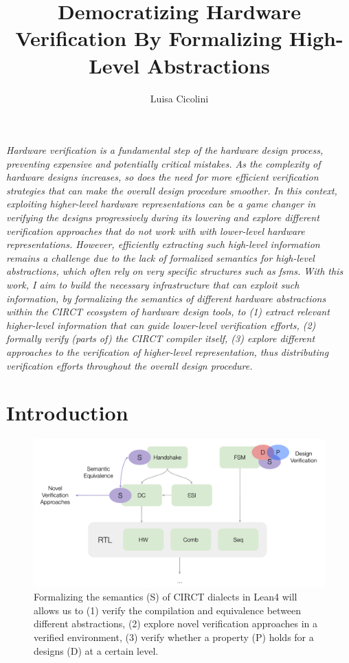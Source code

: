\documentclass[sigconf,authorversion,nonacm, 11pt]{acmart}
\begin{document}
\title{Democratizing Hardware Verification By Formalizing High-Level Abstractions}

\author{Luisa Cicolini}

\maketitle
\thispagestyle{empty}

\textit{
    Hardware verification is a fundamental step of the hardware design process, preventing expensive and potentially critical 
    mistakes.
    As the complexity of hardware designs increases, so does the need for more efficient verification strategies that can 
    make the overall design procedure smoother.
    In this context, exploiting higher-level hardware representations can be a game changer in verifying the designs 
    progressively during its lowering and explore different verification approaches that do not work with 
    with lower-level hardware representations. 
    However, efficiently extracting such high-level information remains a challenge due to the lack of formalized semantics  
    for high-level abstractions, which often rely on very specific structures such as \acp{fsm}.
    With this work, I aim to build the necessary infrastructure that can exploit such information,
    by formalizing the semantics of different hardware abstractions within the CIRCT ecosystem of hardware design tools, to 
    (1) extract relevant higher-level information that can guide lower-level verification efforts, 
    (2) formally verify (parts of) the CIRCT compiler itself, 
    (3) explore different approaches to the verification of higher-level representation, thus distributing verification 
    efforts throughout the overall design procedure. 
}


\section{Introduction}

\begin{figure}[ht]
    \includegraphics[scale=0.8]{semantics.pdf}
    \caption{Formalizing the semantics (S) of CIRCT dialects in Lean4 will allows us to (1) verify the compilation and equivalence 
    between different abstractions, (2) explore novel verification approaches in a verified environment, (3) verify whether a property 
    (P) holds for a designs (D) at a certain level.}
\end{figure}
\end{document}

